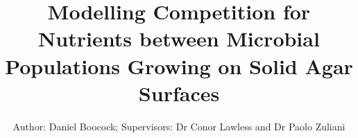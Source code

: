 

\title{Modelling Competition for Nutrients between Microbial Populations Growing on Solid Agar Surfaces}
\author{Author: Daniel Boocock; Supervisors: Dr Conor Lawless and Dr Paolo Zuliani}


\maketitle
\thispagestyle{title}
\noindent\makebox[\linewidth]{\rule{\textwidth}{0.4pt}}

\begin{multicols}{2}








\end{multicols}



